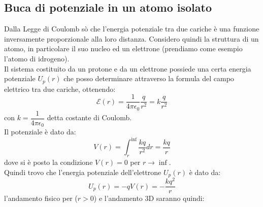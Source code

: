 \subsection{Buca di potenziale in un atomo isolato}
%
Dalla Legge di Coulomb sò che l'energia potenziale tra due cariche è una funzione inversamente proporzionale alla loro distanza.
Considero quindi la struttura di un atomo, in particolare il suo nucleo ed un elettrone (prendiamo come esempio l'atomo di idrogeno). \\
Il sistema costituito da un protone e da un elettrone possiede una certa energia potenziale $U_p(r)$ che posso determinare attraverso la formula del campo elettrico tra due cariche, ottenendo:
\begin{equation*}
    \mathcal{E}(r)=\dfrac{1}{4\pi \epsilon_0} \dfrac{q}{r^2}=k \dfrac{q}{r^2}
\end{equation*}
con $k=\dfrac{1}{4\pi \epsilon_0}$ detta costante di Coulomb.\\
Il potenziale è dato da:
\begin{equation*}
    V(r)=\int_{r}^{\inf}\dfrac{kq}{r^2}dr=\dfrac{kq}{r}
\end{equation*}
dove si è posto la condizione $V(r)=0$ per $r\rightarrow \inf$.\\
Quindi trovo che l'energia potenziale dell'elettrone $U_p(r)$ è dato da:
\begin{equation*}
    U_p(r)=-qV(r)=-\dfrac{kq^2}{r}
\end{equation*}
l'andamento fisico per ($ r>0$) e l'andamento 3D saranno quindi:
